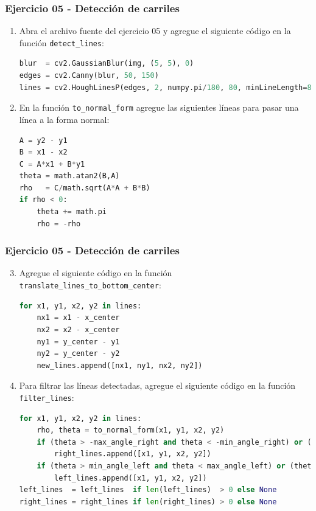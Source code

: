 \begin{frame}[containsverbatim]\frametitle{Ejercicio 05 - Detección de carriles}
  \begin{enumerate}
  \item Abra el archivo fuente del ejercicio 05 y agregue el siguiente código en la función \texttt{detect\_lines}:
    \begin{lstlisting}[language=Python,firstnumber=24]
blur  = cv2.GaussianBlur(img, (5, 5), 0)
edges = cv2.Canny(blur, 50, 150)
lines = cv2.HoughLinesP(edges, 2, numpy.pi/180, 80, minLineLength=80, maxLineGap=100)[:,0]    
    \end{lstlisting}
  \item En la función \texttt{to\_normal\_form} agregue las siguientes líneas para pasar una línea a la forma normal:
    \begin{lstlisting}[language=Python,firstnumber=36]
A = y2 - y1
B = x1 - x2
C = A*x1 + B*y1
theta = math.atan2(B,A)
rho   = C/math.sqrt(A*A + B*B)
if rho < 0:
    theta += math.pi
    rho = -rho  
    \end{lstlisting}
  \end{enumerate}  
\end{frame}

\begin{frame}[containsverbatim]\frametitle{Ejercicio 05 - Detección de carriles}
  \begin{enumerate}
    \setcounter{enumi}{2}
  \item Agregue el siguiente código en la función \texttt{translate\_lines\_to\_bottom\_center}:
    \begin{lstlisting}[language=Python,firstnumber=55]
for x1, y1, x2, y2 in lines:
    nx1 = x1 - x_center
    nx2 = x2 - x_center
    ny1 = y_center - y1
    ny2 = y_center - y2
    new_lines.append([nx1, ny1, nx2, ny2])
    \end{lstlisting}
  \item Para filtrar las líneas detectadas, agregue el siguiente código en la función \texttt{filter\_lines}:
    \begin{lstlisting}[language=Python,firstnumber=80]
for x1, y1, x2, y2 in lines:
    rho, theta = to_normal_form(x1, y1, x2, y2)
    if (theta > -max_angle_right and theta < -min_angle_right) or (theta > min_angle_right and theta < max_angle_right):
        right_lines.append([x1, y1, x2, y2])
    if (theta > min_angle_left and theta < max_angle_left) or (theta > -max_angle_left and theta < -max_angle_left):
        left_lines.append([x1, y1, x2, y2])
left_lines  = left_lines  if len(left_lines)  > 0 else None
right_lines = right_lines if len(right_lines) > 0 else None
    \end{lstlisting}
  \end{enumerate}
\end{frame}

